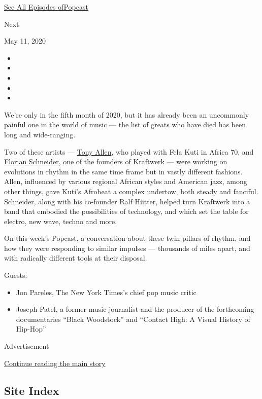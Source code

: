 \href{https://www.nytimes.com/column/popcast-pop-music-podcast}{See All
Episodes ofPopcast}

Next

May 11, 2020

\begin{itemize}
\item
\item
\item
\item
\item
\end{itemize}

We're only in the fifth month of 2020, but it has already been an
uncommonly painful one in the world of music --- the list of greats who
have died has been long and wide-ranging.

Two of these artists ---
\href{https://www.nytimes.com/2020/05/02/arts/music/tony-allen-dead.html}{Tony
Allen}, who played with Fela Kuti in Africa 70, and
\href{https://www.nytimes.com/2020/05/06/arts/music/florian-schneider-kraftwerk-dead.html}{Florian
Schneider}, one of the founders of Kraftwerk --- were working on
evolutions in rhythm in the same time frame but in vastly different
fashions. Allen, influenced by various regional African styles and
American jazz, among other things, gave Kuti's Afrobeat a complex
undertow, both steady and fanciful. Schneider, along with his co-founder
Ralf Hütter, helped turn Kraftwerk into a band that embodied the
possibilities of technology, and which set the table for electro, new
wave, techno and more.

On this week's Popcast, a conversation about these twin pillars of
rhythm, and how they were responding to similar impulses --- thousands
of miles apart, and with radically different tools at their disposal.

Guests:

\begin{itemize}
\item
  Jon Pareles, The New York Times's chief pop music critic
\item
  Joseph Patel, a former music journalist and the producer of the
  forthcoming documentaries ``Black Woodstock'' and ``Contact High: A
  Visual History of Hip-Hop''
\end{itemize}

Advertisement

\protect\hyperlink{after-bottom}{Continue reading the main story}

\hypertarget{site-index}{%
\subsection{Site Index}\label{site-index}}

